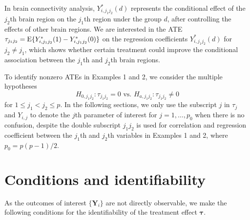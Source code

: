 \documentclass[12pt]{article}
\def\be{\begin{equation}}
\def\ee{\end{equation}}
\theoremstyle{definition}
\newcommand{\E}{\rm E}
\newcommand{\V}{\rm Var}
\newcommand{\bX}{{\mathbf X}}
\newcommand{\bY}{{\mathbf Y}}
\newcommand{\bgamma}{\boldsymbol{\gamma}}
\newcommand{\btau}{\boldsymbol{\tau}}
\begin{document}
In brain connectivity analysis, $Y^{\ast}_{i, j_1j_2}(d)$ represents the conditional effect of the $j_2$th brain region on the $j_1$th region under the group $d$, after controlling 
the effects of other brain regions. 
We are interested in the ATE
$
\tau_{j_1j_2} = {\E}\{Y^{\ast}_{i, j_1j_2}(1) - Y^{\ast}_{i, j_1j_2}(0)\}
$
on the regression coefficients $Y^{\ast}_{i, j_1j_2}(d)$ for $j_2 \neq j_1$, which shows whether certain treatment could improve the conditional association between the $j_1$th and $j_2$th brain regions.

To identify nonzero ATEs in Examples 1 and 2,
we consider the multiple hypotheses 
\be
H_{0, j_1j_2}: \tau_{j_1j_2} = 0 \mbox{ \ vs. \ } H_{a, j_1j_2}: \tau_{j_1j_2} \neq 0
\label{eq:MultiATE}
\ee
for $1 \leq j_1 < j_2 \leq p$. 
In the following sections, we only use the subscript $j$ in $\tau_{j}$ and $Y_{i, j}$ to denote the $j$th parameter of interest for $j = 1, \ldots, p_{0}$ when there is no confusion, despite the double subscript $j_1j_2$ is used for correlation and regression coefficient between the $j_1$th and $j_2$th variables in Examples 1 and 2, 
where $p_{0} = p(p - 1) / 2$.


\setcounter{equation}{0}
\section{Conditions and identifiability}\label{se:identifiability}

As the outcomes of interest $\{\bY_{i}\}$ are not directly observable, 
we make the following conditions for the identifiability of the treatment effect $\btau$.
\end{document}
